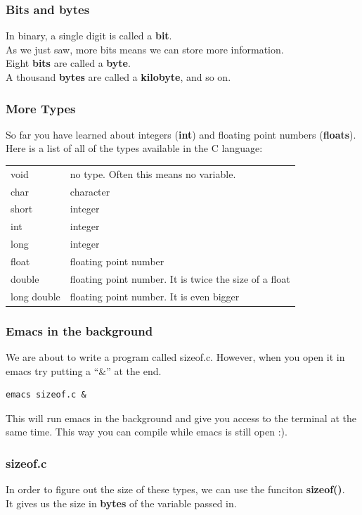 \documentclass{beamer}
\begin{document}
\begin{frame}
  \frametitle{Bits and bytes}
  In binary, a single digit is called a \textbf{bit}.\\
  As we just saw, more bits means we can store more information.\\
  Eight \textbf{bits} are called a \textbf{byte}.\\
  A thousand \textbf{bytes} are called a \textbf{kilobyte}, and so on.
\end{frame}

\begin{frame}[fragile]
  \frametitle{More Types}
  So far you have learned about integers (\textbf{int}) and floating point numbers (\textbf{floats}).
  Here is a list of all of the types available in the C language:
  \begin{tabular}{ll}
      void & no type. Often this means no variable.\\
      char & character\\
      short & integer\\
      int  & integer\\
      long & integer\\
      float & floating point number\\
      double & floating point number. It is twice the size of a float\\
      long double & floating point number. It is even bigger\\
  \end{tabular}
\end{frame}

\begin{frame}[fragile]
  \frametitle{Emacs in the background}
  We are about to write a program called sizeof.c. However, when you open
  it in emacs try putting a ``\&'' at the end.
  \begin{lstlisting}[style=custombash]
    emacs sizeof.c &
  \end{lstlisting}
  This will run emacs in the background and give you access to the terminal
  at the same time. This way you can compile while emacs is still open :).
\end{frame}

\begin{frame}
  \frametitle{sizeof.c}
  In order to figure out the size of these types, we can use the funciton \textbf{sizeof()}.\\
  It gives us the size in \textbf{bytes} of the variable passed in.
  
\end{frame}
\end{document}
